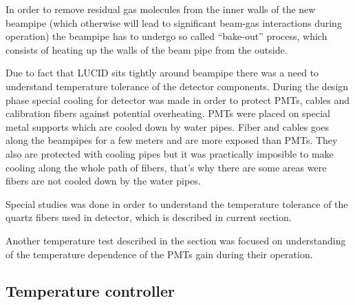 In order to remove residual gas molecules from the inner walls of the new beampipe (which otherwise will lead to significant beam-gas interactions during operation)
the beampipe has to undergo so called ``bake-out'' process, which consists of heating up the walls of the beam pipe from the outside.

Due to fact that LUCID sits tightly around beampipe there was a need to understand temperature tolerance of the detector components.
During the design phase special cooling for detector was made in order to protect PMTs, cables and calibration fibers against potential overheating.
PMTs were placed on special metal supports which are cooled down by water pipes.
Fiber and cables goes along the beampipes for a few meters and are more exposed than PMTs.
They also are protected with cooling pipes but it was practically imposible to make cooling along the whole path of fibers,
that's why there are some areas were fibers are not cooled down by the water pipes.

Special studies was done in order to understand the temperature tolerance of the quartz fibers used in detector, which is described in current section.


Another temperature test described in the section was focused on understanding of the temperature dependence of the PMTs gain during their operation.









\subsection{Temperature controller}
\label{subsec:tempController}

